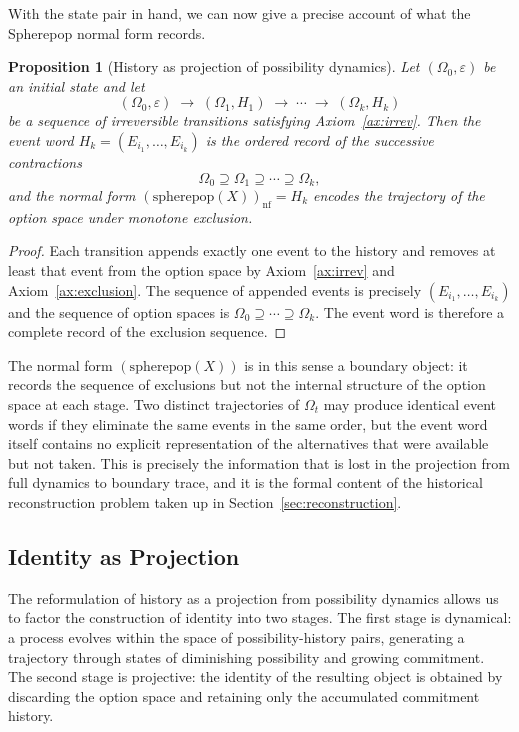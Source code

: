 \documentclass[12pt]{article}
\theoremstyle{plain}
\newtheorem{proposition}[theorem]{Proposition}
\theoremstyle{definition}
\theoremstyle{remark}
\begin{document}
With the state pair in hand, we can now give a precise account of what the
Spherepop normal form records.

\begin{proposition}[History as projection of possibility dynamics]
\label{prop:history-projection}
Let $(\Omega_0, \varepsilon)$ be an initial state and let
\[
  (\Omega_0, \varepsilon) \;\longrightarrow\;
  (\Omega_1, H_1) \;\longrightarrow\; \cdots \;\longrightarrow\;
  (\Omega_k, H_k)
\]
be a sequence of irreversible transitions satisfying Axiom~\ref{ax:irrev}.
Then the event word $H_k = (E_{i_1}, \ldots, E_{i_k})$ is the ordered record
of the successive contractions
\[
  \Omega_0 \supseteq \Omega_1 \supseteq \cdots \supseteq \Omega_k,
\]
and the normal form $(\mathrm{spherepop}(X))_{\mathrm{nf}} = H_k$ encodes
the trajectory of the option space under monotone exclusion.
\end{proposition}

\begin{proof}
Each transition appends exactly one event to the history and removes at least
that event from the option space by Axiom~\ref{ax:irrev} and
Axiom~\ref{ax:exclusion}.  The sequence of appended events is precisely
$(E_{i_1}, \ldots, E_{i_k})$ and the sequence of option spaces is
$\Omega_0 \supseteq \cdots \supseteq \Omega_k$.  The event word is therefore
a complete record of the exclusion sequence.
\end{proof}

The normal form $(\mathrm{spherepop}(X))$ is in this sense a boundary object:
it records the sequence of exclusions but not the internal structure of the
option space at each stage.  Two distinct trajectories of $\Omega_t$ may
produce identical event words if they eliminate the same events in the same
order, but the event word itself contains no explicit representation of the
alternatives that were available but not taken.  This is precisely the
information that is lost in the projection from full dynamics to boundary
trace, and it is the formal content of the historical reconstruction problem
taken up in Section~\ref{sec:reconstruction}.

\subsection{Identity as Projection}

The reformulation of history as a projection from possibility dynamics allows
us to factor the construction of identity into two stages.  The first stage is
dynamical: a process evolves within the space of possibility-history pairs,
generating a trajectory through states of diminishing possibility and growing
commitment.  The second stage is projective: the identity of the resulting
object is obtained by discarding the option space and retaining only the
accumulated commitment history.
\end{document}
